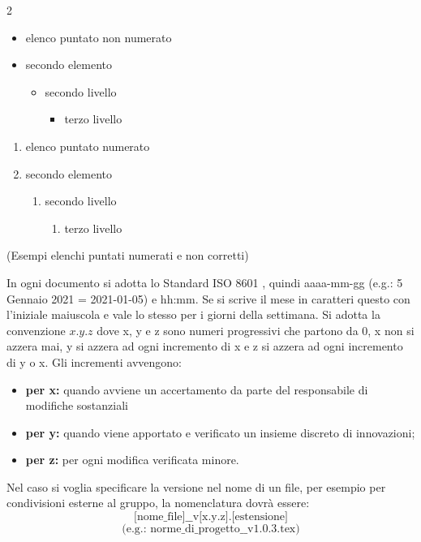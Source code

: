         \begin{multicols}{2}
            \begin{itemize}
                \item elenco puntato non numerato
                \item secondo elemento
                \begin{itemize}
                    \item secondo livello
                    \begin{itemize}
                        \item terzo livello
                    \end{itemize}
                \end{itemize}
            \end{itemize}
            \begin{enumerate}
                \item elenco puntato numerato
                \item secondo elemento
                \begin{enumerate}
                    \item secondo livello
                    \begin{enumerate}
                        \item terzo livello
                    \end{enumerate}
                \end{enumerate}
            \end{enumerate}
        \end{multicols}
        \centerline{(Esempi elenchi puntati numerati e non corretti)}
        In ogni documento si adotta lo Standard ISO 8601 , quindi aaaa-mm-gg (e.g.: 5 Gennaio 2021 = 2021-01-05) e hh:mm. Se si scrive il mese in caratteri questo con l'iniziale maiuscola e vale lo stesso per i giorni della settimana.
        \label{versions}
        Si adotta la convenzione $x.y.z$ dove x, y e z sono numeri progressivi che partono da 0, x non si azzera mai, y si azzera ad ogni incremento di x e z si azzera ad ogni incremento di y o x. Gli incrementi avvengono:
        \begin{itemize}
            \item \textbf{per x: }quando avviene un accertamento da parte del responsabile di modifiche sostanziali
            \item \textbf{per y: }quando viene apportato e verificato un insieme discreto di innovazioni;
            \item \textbf{per z: }per ogni modifica verificata minore.
        \end{itemize}
        Nel caso si voglia specificare la versione nel nome di un file, per esempio per condivisioni esterne al gruppo, la nomenclatura dovrà essere: $$\text{[nome\_file]\_\_v[x.y.z].[estensione]}$$ $$\text{(e.g.: norme\_di\_progetto\_\_v1.0.3.tex)}$$

